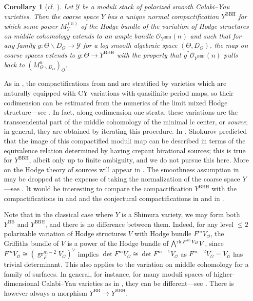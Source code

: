 \documentclass{amsart}
\newcommand{\bs}{\backslash}
\newcommand{\ol}{\overline}
\newtheorem{cor}[theorem]{Corollary}
\theoremstyle{definition}
\theoremstyle{remark}
\def\cO{\mathcal{O}}
\def\cY{\mathcal{Y}}
\def\gr{\operatorname{gr}}
\def\rk{\operatorname{rk}}
\def\BB{\mathrm{BB}}
\renewcommand{\bar}[1]{\ol{#1}}
\def\BBH{\mathrm{BBH}}
\numberwithin{equation}{section}
\newcommand{\Exterior}{\mathchoice{{\textstyle\bigwedge}}%
    {{\bigwedge}}%
    {{\textstyle\wedge}}%
    {{\scriptstyle\wedge}}}
\def\testsp{\Theta}
\begin{document}
\begin{cor}[cf. ]\label{cor:introCYmod}  Let $\cY$ be a moduli stack of 
polarized smooth Calabi--Yau varieties.
Then the coarse space $Y$ has a unique normal compactification $Y^\BBH$ for which some power $M_Y^{(n)}$ of the Hodge bundle of the variation of Hodge structures on middle cohomology extends to an ample bundle $\cO_{Y^\BBH}(n)$ and such that for any family $g:\testsp\bs D_\testsp\to \cY$
for a log smooth algebraic space $(\Theta,D_\Theta)$, the map on coarse spaces extends to $\bar g:\testsp\to Y^\BBH$ with the property that $\bar g^*\cO_{Y^\BBH}(n)$ pulls back to $(M^n_{\testsp\bs D_\testsp})_\testsp$.
\end{cor}


As in , the compactifications from  and  are stratified by varieties which are naturally equipped with CY variations with quasifinite period maps,
so their codimension can be estimated from the numerics of the limit mixed Hodge structure---see .  In fact, along codimension one strata, these variations are the transcendental part of the middle cohomology of the minimal lc center, or \emph{source}; in general, they are obtained by iterating this procedure. In \cite[p.5]{shokurov13}, Shokurov predicted that the image of this compactified moduli map can be described in terms of the equivalence relation determined by having crepant birational sources; this is true for $Y^\BBH$, albeit only up to finite ambiguity, and we do not pursue this here.
More on the Hodge theory of sources will appear in \cite{Laza2025}.
The smoothness assumption in  may be dropped at the expense of taking the normalization of the coarse space $Y$---see .  It would be interesting to compare the compactification $Y^{\BBH}$ with the compactifications in \cite{KX20} and \cite[Theorem 1.14]{Bir22} and the conjectural compactifications in \cite[Conj.~B.1]{Odaka2022} and in \cite[\S 4.1.3]{Spotti25}. 

Note that in the classical case where $Y$ is a Shimura variety, we may form both $Y^\BB$ and $Y^\BBH$, and there is no difference between them.  Indeed, for any level $\leq 2$ polarizable variation of Hodge structures $V$ with Hodge bundle $F^mV_\cO$, the Griffiths bundle of $V$ is a power of the Hodge bundle of $\Exterior^{\rk F^mV_\cO}V$, since $F^mV_\cO\cong (\gr_F^{m-2}V_\cO)^\vee$ implies $\det F^mV_\cO\cong \det F^{m-1}V_\cO$ as $F^{m-2}V_\cO=V_\cO$ has trivial determinant.  This also applies to the variation on middle cohomology for a family of surfaces.  In general, for instance, for many moduli spaces of higher-dimensional Calabi--Yau varieties as in , they can be different---see .  There is however always a morphism $Y^\BB\to Y^\BBH$.
\end{document}
